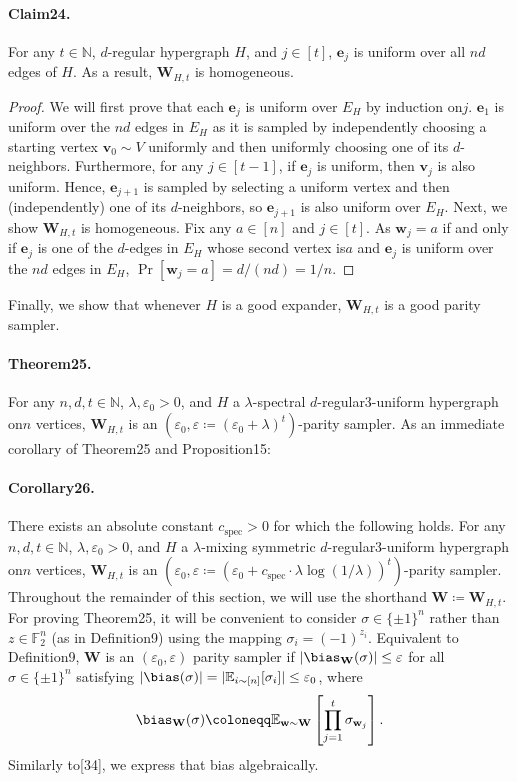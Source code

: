 \paragraph{Claim24.} For any $t\in\mathbb N$, $d$-regular hypergraph $H$, and $j\in[t]$, $\mathbf e_j$ is uniform over all $nd$ edges of $H$. As a result, $\mathbf W_{H,t}$ is homogeneous.
\begin{proof}
We will first prove that each $\mathbf e_j$ is uniform over $E_H$ by induction on$j$. $\mathbf e_1$ is uniform over the $nd$ edges in $E_H$ as it is sampled by independently choosing a starting vertex $\mathbf v_0\sim V$ uniformly and then uniformly choosing one of its $d$-neighbors. Furthermore, for any $j\in[t-1]$, if $\mathbf e_j$ is uniform, then $\mathbf v_j$ is also uniform. Hence, $\mathbf e_{j+1}$ is sampled by selecting a uniform vertex and then (independently) one of its $d$-neighbors, so $\mathbf e_{j+1}$ is also uniform over $E_H$.
Next, we show $\mathbf W_{H,t}$ is homogeneous. Fix any $a\in[n]$ and $j\in[t]$. As $\mathbf w_j=a$ if and only if $\mathbf e_j$ is one of the $d$-edges in $E_H$ whose second vertex is$a$ and $\mathbf e_j$ is uniform over the $nd$ edges in $E_H$, $\Pr[\mathbf w_j=a]=d/(nd)=1/n$.
\end{proof}
Finally, we show that whenever $H$ is a good expander, $\mathbf W_{H,t}$ is a good parity sampler.
\paragraph{Theorem25.} For any $n,d,t\in\mathbb N$, $\lambda,\varepsilon_0>0$, and $H$ a $\lambda$-spectral $d$-regular3-uniform hypergraph on$n$ vertices, $\mathbf W_{H,t}$ is an $(\varepsilon_0,\varepsilon\coloneqq(\varepsilon_0+\lambda)^t)$-parity sampler.
As an immediate corollary of Theorem25 and Proposition15:
\paragraph{Corollary26.} There exists an absolute constant $c_{\mathrm{spec}}>0$ for which the following holds. For any $n,d,t\in\mathbb N$, $\lambda,\varepsilon_0>0$, and $H$ a $\lambda$-mixing symmetric $d$-regular3-uniform hypergraph on$n$ vertices, $\mathbf W_{H,t}$ is an $(\varepsilon_0,\varepsilon\coloneqq(\varepsilon_0+c_{\mathrm{spec}}\cdot\lambda\log(1/\lambda))^t)$-parity sampler.
Throughout the remainder of this section, we will use the shorthand $\mathbf W\coloneqq\mathbf W_{H,t}$. For proving Theorem25, it will be convenient to consider $\sigma\in\{\pm1\}^n$ rather than $z\in\mathbb F_2^n$ (as in Definition9) using the mapping $\sigma_i=(-1)^{z_i}$. Equivalent to Definition9, $\mathbf W$ is an $(\varepsilon_0,\varepsilon)$ parity sampler if $|\bias_{\mathbf W}(\sigma)|\leq\varepsilon$ for all $\sigma\in\{\pm1\}^n$ satisfying $|\bias(\sigma)|=|\mathbb E_{i\sim[n]}[\sigma_i]|\leq\varepsilon_0$, where
\[\bias_{\mathbf W}(\sigma)\coloneqq\mathbb E_{\mathbf w\sim\mathbf W}\left[\prod_{j=1}^t\sigma_{\mathbf w_j}\right].\]
Similarly to[34], we express that bias algebraically.
